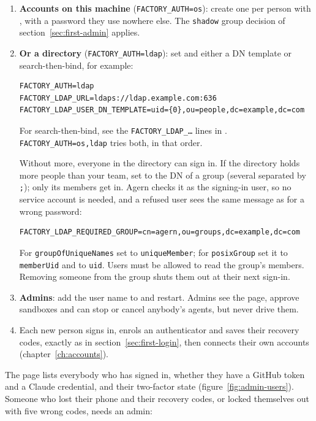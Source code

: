 \begin{enumerate}
  \item \textbf{Accounts on this machine} (\texttt{FACTORY\_AUTH=os}): create one per person with
    , with a password they use nowhere else. The \texttt{shadow} group
    decision of section~\ref{sec:first-admin} applies.
  \item \textbf{Or a directory} (\texttt{FACTORY\_AUTH=ldap}): set  and
    either a DN template or search-then-bind, for example:
\begin{lstlisting}[style=conf]
FACTORY_AUTH=ldap
FACTORY_LDAP_URL=ldaps://ldap.example.com:636
FACTORY_LDAP_USER_DN_TEMPLATE=uid={0},ou=people,dc=example,dc=com
\end{lstlisting}
    For search-then-bind, see the \texttt{FACTORY\_LDAP\_\ldots} lines in
    . \texttt{FACTORY\_AUTH=os,ldap} tries both, in that order.

    Without more, everyone in the directory can sign in. If the directory holds more people than
    your team, set  to the DN of a group (several separated by
    \texttt{;}); only its members get in. Agern checks it as the signing-in user, so no service
    account is needed, and a refused user sees the same message as for a wrong password:
\begin{lstlisting}[style=conf]
FACTORY_LDAP_REQUIRED_GROUP=cn=agern,ou=groups,dc=example,dc=com
\end{lstlisting}
    For \texttt{groupOfUniqueNames} set  to
    \texttt{uniqueMember}; for \texttt{posixGroup} set it to \texttt{memberUid} and
     to \texttt{uid}. Users must be allowed to read the
    group's members. Removing someone from the group shuts them out at their next sign-in.
  \item \textbf{Admins}: add the user name to  and restart. Admins see the
     page, approve sandboxes and can stop or cancel anybody's agents, but never drive
    them.
  \item Each new person signs in, enrols an authenticator and saves their recovery codes, exactly
    as in section~\ref{sec:first-login}, then connects their own accounts
    (chapter~\ref{ch:accounts}).
\end{enumerate}

The  page lists everybody who has signed in, whether they have a GitHub token and a
Claude credential, and their two-factor state (figure~\ref{fig:admin-users}). Someone who lost
their phone and their recovery codes, or locked themselves out with five wrong codes, needs an
admin:

